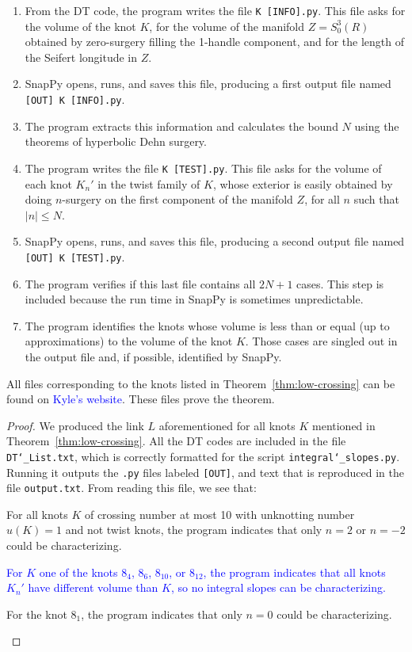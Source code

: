 \documentclass[11pt,usenames,dvipsnames,reqno]{amsart}
\numberwithin{theorem}{section}
\theoremstyle{ex}
\theoremstyle{rem}
\def\kh#1{\textcolor{Blue}{#1}}
\begin{document}
\begin{enumerate}
	\item From the DT code, the program writes the file \texttt{K [INFO].py}. This file asks for the volume of the knot $K$, for the volume of the manifold $Z = S_0^3(R)$ obtained by zero-surgery filling the 1-handle component, and for the length of the Seifert longitude in $Z$.
	\item SnapPy opens, runs, and saves this file, producing a first output file named \texttt{[OUT] K [INFO].py}.
	\item The program extracts this information and calculates the bound $N$ using the theorems of hyperbolic Dehn surgery.
	\item The program writes the file \texttt{K [TEST].py}. This file asks for the volume of each knot $K_{n}'$ in the twist family of $K$, whose exterior is easily obtained by doing $n$-surgery on the first component of the manifold $Z$, for all $n$ such that $|n| \leq N$.
	\item SnapPy opens, runs, and saves this file, producing a second output file named \texttt{[OUT] K [TEST].py}.
	\item The program verifies if this last file contains all $2 N + 1$ cases. This step is included because the run time in SnapPy is sometimes unpredictable.
	\item The program identifies the knots whose volume is less than or equal (up to approximations) to the volume of the knot $K$. Those cases are singled out in the output file and, if possible, identified by SnapPy.
\end{enumerate}

All files corresponding to the knots listed in Theorem~\ref{thm:low-crossing} can be found on \kh{Kyle's website}. These files prove the theorem.

\begin{proof} We produced the link $L$ aforementioned for all knots $K$ mentioned in Theorem~\ref{thm:low-crossing}. All the DT codes are included in the file \texttt{DT\char`_List.txt}, which is correctly formatted for the script \texttt{integral\char`_slopes.py}. Running it outputs the \texttt{.py} files labeled \texttt{[OUT]}, and text that is reproduced in the file \texttt{output.txt}. From reading this file, we see that:
	\begin{enumerate}[label=\normalfont (\alph*)]
		\item For all knots $K$ of crossing number at most 10 with unknotting number $u(K) = 1$ and not twist knots, the program indicates that only $n = 2$ or $n = -2$ could be characterizing.
		\kh{\item For $K$ one of the knots $8_4$, $8_6$, $8_{10}$, or $8_{12}$, the program indicates that all knots $K_{n}'$ have different volume than $K$, so no integral slopes can be characterizing.}
		\item For the knot $8_1$, the program indicates that only $n = 0$ could be characterizing.
	\end{enumerate}
\end{proof}
\end{document}
